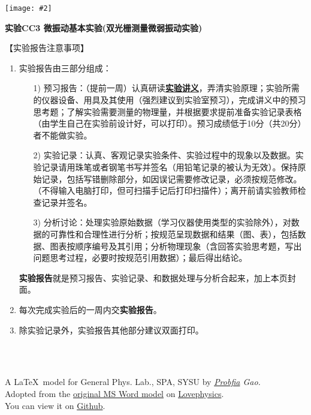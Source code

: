 \documentclass[11pt,a4paper]{ctexart}
\newcommand{\ExpeName}{实验CC3 微振动基本实验(双光栅测量微弱振动实验)}
\newcommand{\cpic}[2]{
\begin{center}
\texttt{[image: \#2]}
\end{center}
}
\begin{document}
\cpic{0.255}{e1}%
\begin{center}
\LARGE\textbf{{\ExpeName}}
\end{center}
\large{【实验报告注意事项】}
\begin{enumerate}
 \item 实验报告由三部分组成：
 \begin{enumerate}
  \item[1)]预习报告：（提前一周）认真研读\textbf{\uline{实验讲义}}，弄清实验原理；实验所需的仪器设备、用具及其使用（强烈建议到实验室预习），完成讲义中的预习思考题；了解实验需要测量的物理量，并根据要求提前准备实验记录表格（由学生自己在实验前设计好，可以打印）。预习成绩低于10分（共20分）者不能做实验。
  \item[2)]实验记录：认真、客观记录实验条件、实验过程中的现象以及数据。实验记录请用珠笔或者钢笔书写并签名（{\color{red}用铅笔记录的被认为无效}）。{\color{red}保持原始记录，包括写错删除部分，如因误记需要修改记录，必须按规范修改。}（不得输入电脑打印，但可扫描手记后打印扫描件）；离开前请实验教师检查记录并签名。
  \item[3)]分析讨论：处理实验原始数据（学习仪器使用类型的实验除外），对数据的可靠性和合理性进行分析；按规范呈现数据和结果（图、表），包括数据、图表按顺序编号及其引用；分析物理现象（含回答实验思考题，写出问题思考过程，必要时按规范引用数据）；最后得出结论。
 \end{enumerate}
 \textbf{实验报告}就是预习报告、实验记录、和数据处理与分析合起来，加上本页封面。
 \item 每次完成实验后的一周内交\textbf{实验报告}。
 \item 除实验记录外，实验报告其他部分建议双面打印。
\end{enumerate}
\ 
\\
\ 

\begin{flushright}                                                           %
\tiny{
A \LaTeX \ model for General Phys. Lab., SPA, SYSU by {\em \href{https://www.weibo.com/3532532974/profile?rightmod=1&wvr=6&mod=personinfo&is_all=1}{Probfia} Gao.}\\ Adopted from the \href{http://lovephysics.sysu.edu.cn/lib/exe/fetch.php?media=courses:secondlevelzhuhai:report.docx}{original MS Word model} on \href{http://lovephysics.sysu.edu.cn}{Lovephysics}.\\ You can view it on \href{https://github.com/Probfia/SYSU_GPL_C}{Github}.}
\end{flushright}
\end{document}
